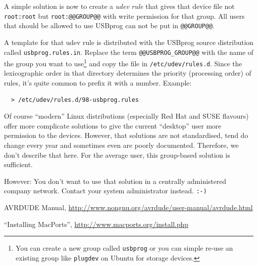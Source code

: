 \documentclass[bibtotoc,UKenglish,halfparskip,oneside,DIV12]{scrreprt}
\begin{document}
A simple solution is now to create a \emph{udev rule} that gives that device file not
\texttt{root:root} but \texttt{root:@@GROUP@@} with write permission for that group. All users that
should be allowed to use USBprog can not be put in \texttt{@@GROUP@@}.

A template for that udev rule is distributed with the USBprog source distribution called
\texttt{usbprog.rules.in}.  Replace the term \texttt{@@USBPROG\_GROUP@@} with the name of the group
you want to use\footnote{You can create a new group called \texttt{usbprog} or you can simple re-use
an existing group like \texttt{plugdev} on Ubuntu for storage devices.} and copy the file in
\texttt{/etc/udev/rules.d}.  Since the lexicographic order in that directory determines the priority
(processing order) of rules, it's quite common to prefix it with a number. Example:

\begin{lstlisting}[style=inline]
% sed -e 's/@@USBPROG_GROUP@@/plugdev/g' usbprog.rules.in \
  > /etc/udev/rules.d/98-usbprog.rules
\end{lstlisting}

Of course ``modern'' Linux distributions (especially Red Hat and SUSE flavours) offer more
complicate solutions to give the current ``desktop'' user more permission to the devices. However,
that solutions are not standardised, tend do change every year and sometimes even are poorly
documented. Therefore, we don't describe that here. For the average user, this group-based solution
is sufficient.

However: You don't want to use that solution in a centrally administered company network. Contact
your system administrator instead. \texttt{:-)}






\begin{thebibliography}{99}
   AVRDUDE Manual,
    \url{http://www.nongnu.org/avrdude/user-manual/avrdude.html}

   ``Installing MacPorts'', \url{http://www.macports.org/install.php}
\end{thebibliography}
\end{document}
